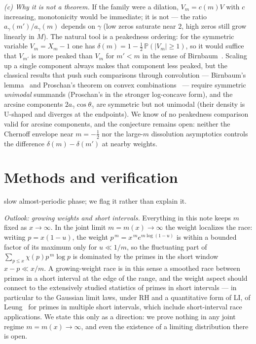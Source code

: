 \emph{(c) Why it is not a theorem.} If the family were a dilation,
$V_{m}=c(m)V$ with $c$ increasing, monotonicity would be immediate; it
is not --- the ratio $a_\gamma(m')/a_\gamma(m)$ depends on $\gamma$
(low zeros saturate near $2$, high zeros still grow linearly in $M$).
The natural tool is a peakedness ordering: for the symmetric variable
$V_m=X_m-1$ one has $\delta(m)=1-\tfrac12\,\mathbb P(|V_m|\ge1)$, so it
would suffice that $V_{m'}$ is more peaked than $V_m$ for $m'<m$ in the
sense of Birnbaum~\cite{Bir48}. Scaling up a single component always
makes that component less peaked, but the classical results that push
such comparisons through convolution --- Birnbaum's
lemma~\cite{Bir48} and Proschan's theorem on convex
combinations~\cite{Pro65} --- require symmetric \emph{unimodal}
summands (Proschan's in the stronger log-concave form), and the
arcsine components $2a_\gamma\cos\theta_\gamma$ are symmetric but not
unimodal (their density is U-shaped and diverges at the endpoints). We know of no peakedness comparison valid for arcsine
components, and the conjecture remains open: neither the Chernoff
envelope near $m=-\tfrac12$ nor the large-$m$ dissolution asymptotics
controls the difference $\delta(m)-\delta(m')$ at nearby weights.

\section{Methods and verification}\label{sec:methods}


slow almost-periodic phase; we flag it rather than explain it.

\emph{Outlook: growing weights and short intervals.} Everything in
this note keeps $m$ fixed as $x\to\infty$. In the joint limit
$m=m(x)\to\infty$ the weight localizes the race: writing $p=x(1-u)$,
the weight $p^{\,m}=x^{\,m}e^{m\log(1-u)}$ is within a bounded factor
of its maximum only for $u\ll1/m$, so the fluctuating part of
$\sum_{p\le x}\chi(p)p^{\,m}\log p$ is dominated by the primes in the
short window $x-p\ll x/m$. A growing-weight race is in this sense a
smoothed race between primes in a short interval at the edge of the
range, and the weight aspect should connect to the extensively studied
statistics of primes in short intervals --- in particular to the
Gaussian limit laws, under RH and a quantitative form of LI, of
Leung~\cite{Leung24} for primes in multiple short intervals, which
include short-interval race applications. We state this only as a
direction: we prove nothing in any joint regime $m=m(x)\to\infty$, and
even the existence of a limiting distribution there is open.



